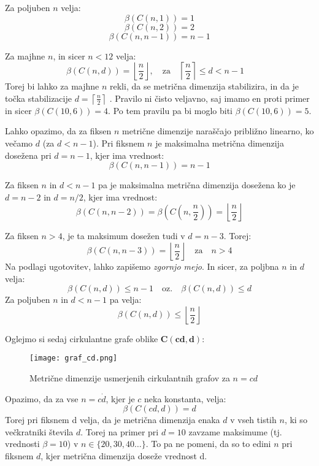 \documentclass[a4paper,12pt]{article}
\theoremstyle{definition}
\theoremstyle{remark}
\theoremstyle{definition}
\begin{document}
Za poljuben $n$ velja:
\[
    \beta(C(n, 1)) = 1
\]
\[
    \beta(C(n, 2)) = 2
\]
\[
    \beta(C(n, n-1)) = n-1
\]

\noindent
Za majhne $n$, in sicer $n < 12$ velja:
\[
    \beta(C(n, d)) = \left\lfloor \frac{n}{2} \right\rfloor, \quad \text{za} \quad \left\lceil \frac{n}{2} \right\rceil \leq d < n-1 \quad
\]
\noindent
Torej bi lahko za majhne $n$ rekli, da se metrična dimenzija stabilizira, in da je točka stabilizacije $ d = \left\lceil \frac{n}{2} \right\rceil$ .
Pravilo ni čisto veljavno, saj imamo en proti primer in sicer $\beta(C(10, 6)) = 4$. Po tem pravilu pa bi moglo biti $\beta(C(10, 6)) = 5$. 
\\

\par 
\noindent
Lahko opazimo, da za fiksen $n$ metrične dimenzije naraščajo približno linearno, ko večamo $d$ (za $d < n-1$).
Pri fiksnem $n$ je maksimalna metrična dimenzija dosežena pri $d = n - 1$, kjer ima vrednost: 
\[
    \beta(C(n, n-1)) = n-1
\]

\noindent
Za fiksen $n$ in $d < n - 1$ pa je maksimalna metrična dimenzija dosežena ko je $d = n -2$ in $d = n/2$, 
kjer ima vrednost:
\[
    \beta(C(n, n-2)) = \beta\left(C\left(n, \frac{n}{2}\right)\right) = \left\lfloor \frac{n}{2} \right\rfloor
\]

\noindent
Za fiksen $n > 4$, je ta maksimum dosežen tudi v $d = n - 3$. Torej:
\[
    \beta(C(n, n-3)) = \left\lfloor \frac{n}{2} \right\rfloor \quad \text{za} \quad n > 4
\]
\noindent
Na podlagi ugotovitev, lahko zapišemo \textit{zgornjo mejo}. In sicer, za poljbna $n$ in $d$ velja:
\[\beta(C(n,d)) \leq n - 1 \quad \text{oz.} \quad  \beta(C(n,d)) \leq d\]  
\noindent
Za poljuben $n$ in $d < n-1$ pa velja:
\[\beta(C(n ,d)) \leq \left\lfloor \frac{n}{2} \right\rfloor\]


\par
\noindent
Oglejmo si sedaj cirkulantne grafe oblike $\mathbf{C( cd, d )}$:

\begin{figure}[H]  
    \centering
    \texttt{[image: graf\_cd.png]}  
    \caption{Metrične dimenzije usmerjenih cirkulantnih grafov za $n = cd$} 
    \label{fig:screenshot}  
\end{figure}

\noindent
Opazimo, da za vse $n = c \dot d$, kjer je $c$ neka konstanta, velja:
\[
    \beta(C(cd, d)) = d
\]
\noindent
Torej pri fiksnem d velja, da je metrična dimenzija enaka $d$ v vseh tistih $n$, ki so večkratniki števila $d$.
Torej na primer pri $d = 10$ zavzame maksimume (tj. vrednosti $\beta = 10$) v $ n \in \{20, 30, 40 \dots\} $.
To pa ne pomeni, da so to edini $n$ pri fiksnem $d$, kjer metrična dimenzija doseže vrednost d. 
\end{document}
